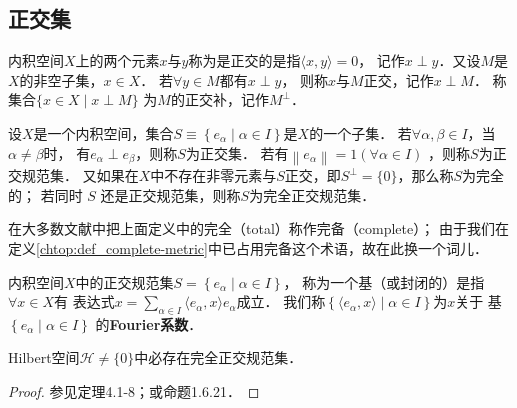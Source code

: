 \subsection{正交集}



\begin{definition}
	内积空间$X$上的两个元素$x$与$y$称为是{\heiti 正交的}是指$\langle x, y \rangle =0$，
	记作$x \perp y$．又设$M$是$X$的非空子集，$x \in X$．
	若$\forall y \in M$都有$x \perp y$，
	则称$x$与$M${\heiti 正交}，记作$x \perp M$．
	称集合$\{x \in {X} \mid x \perp M\}$	
	为$M$的{\heiti 正交补}，记作$M^{\perp}$．	
\end{definition}

\begin{definition}
	设$X$是一个内积空间，集合$S\equiv\left\{e_\alpha \mid \alpha \in I \right\}$是$X$的一个子集．
	若$\forall \alpha, \beta \in I$，当$\alpha \neq \beta$时，
	有$e_\alpha \perp e_\beta$，则称$S$为{\heiti 正交集}．
	若有$\left\|e_\alpha\right\|=1 (\forall \alpha \in I)$ ，则称$S$为{\heiti 正交规范集}．
	又如果在$X$中不存在非零元素与$S$正交，即$S^{\perp}=\{0\}$，那么称$S$为{\heiti 完全的}；
	若同时 $S$ 还是正交规范集，则称$S$为{\heiti 完全正交规范集}．
\end{definition}

\begin{remark}
	在大多数文献中把上面定义中的{\kaishu 完全}（total）称作{\kaishu 完备}（complete）；
	由于我们在定义\ref{chtop:def_complete-metric}中已占用{\kaishu 完备}这个术语，故在此换一个词儿．
\end{remark}

\begin{definition}
	内积空间$X$中的正交规范集$S=\left\{e_\alpha \mid \alpha \in I\right\}$，
	称为一个{\heiti 基}（或{\heiti 封闭的}）是指 $\forall x \in X$有
	表达式$x=\sum_{\alpha \in I}\langle e_\alpha,x \rangle e_\alpha$成立．
    我们称$\left\{\langle e_\alpha ,x \rangle \mid \alpha \in I\right\}$为$x$关于
    基$\left\{e_\alpha \mid \alpha \in I\right\}$ 的{\heiti \bfseries Fourier系数}．
\end{definition}


\begin{theorem}
	Hilbert空间$\mathcal{H}\neq \{0\}$中必存在完全正交规范集．
\end{theorem}
\begin{proof}
	参见\parencite{Kreyszig-1991}定理4.1-8；或\parencite{zhang-lin-2021}命题1.6.21．
\end{proof}

